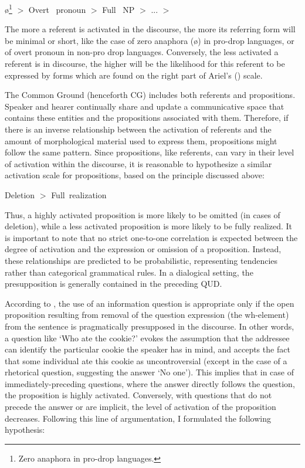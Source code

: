 \ea \label{ex:4:2}
 {\large  ø\footnote{Zero anaphora in pro-drop languages.} $>$  Overt \ pronoun $>$  Full \ NP $>$  ... $>$ }
  \z

The more a referent is activated in the discourse, the more its referring form will be minimal or short, like the case of zero anaphora (ø) in pro-drop languages, or of overt pronoun in non-pro drop languages. Conversely, the less activated a referent is in discourse, the higher will be the likelihood for this referent to be expressed by forms which are found on the right part of Ariel's (\citeyear{ariel2001accessibility}) scale.

The Common Ground (henceforth CG) includes both referents and propositions. Speaker and hearer continually share and update a communicative space that contains these entities and the propositions associated with them. Therefore, if there is an inverse relationship between the activation of referents and the amount of morphological material used to express them, propositions might follow the same pattern. Since propositions, like referents, can vary in their level of activation within the discourse, it is reasonable to hypothesize a similar activation scale for propositions, based on the principle discussed above: 

\ea \label{ex:4:3}
  {\large Deletion $>$ Full\ realization}
  \z

Thus, a highly activated proposition is more likely to be omitted (in cases of deletion), while a less activated proposition is more likely to be fully realized. It is important to note that no strict one-to-one correlation is expected between the degree of activation and the expression or omission of a proposition. Instead, these relationships are predicted to be probabilistic, representing tendencies rather than categorical grammatical rules.
In a dialogical setting, the presupposition is generally contained in the preceding QUD. 

According to \textcite{lambrecht1996information}, the use of an information question is appropriate only if the open proposition resulting from removal of the question expression (the wh-element) from the sentence is pragmatically presupposed in the discourse. In other words, a question like `Who ate the cookie?' evokes the assumption that the addressee can identify the particular cookie the speaker has in mind, and accepts the fact that some individual ate this cookie as uncontroversial  (except in the case of a rhetorical  question, suggesting the answer `No one').
This implies that in case of immediately-preceding questions, where the answer directly follows the question, the proposition is highly activated. Conversely, with questions that do not precede the answer or are implicit, the level of activation of the proposition decreases. Following this line of argumentation, I formulated the following hypothesis:

